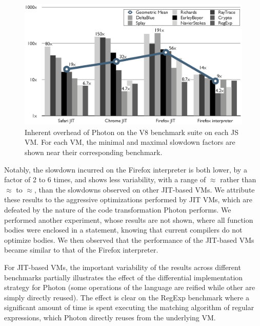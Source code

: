 \begin{figure}[htbp]
\begin{center}
\includegraphics[width=.85\textwidth]{figures/InherentOverhead}
\caption[Inherent overhead of Photon]{Inherent overhead of Photon on the V8
benchmark suite on each JS VM. For each VM, the minimal and maximal slowdown
factors are shown near their corresponding benchmark.}
\label{fig:inherent-overhead-v8-benchmarks}
\end{center}
\end{figure}

Notably, the slowdown incurred on the Firefox interpreter is both lower, by a
factor of 2 to 6 times, and shows less variability, with a range of
$\approx$ rather than $\approx$ to $\approx$,
than the slowdowns observed on other JIT-based VMs. We attribute these results
to the aggressive optimizations performed by JIT VMs, which are defeated by the
nature of the code transformation Photon performs. We performed another
experiment, whose results are not shown, where all function bodies were
enclosed in a  statement, knowing that current compilers do not
optimize  bodies. We then observed that the performance of the
JIT-based VMs became similar to that of the Firefox interpreter.

For JIT-based VMs, the important variability of the results across different
benchmarks partially illustrates the effect of the differential implementation
strategy for Photon (some operations of the language are reified while other
are simply directly reused). The effect is clear on the RegExp benchmark where
a significant amount of time is spent executing the matching algorithm of
regular expressions, which Photon directly reuses from the underlying VM.

